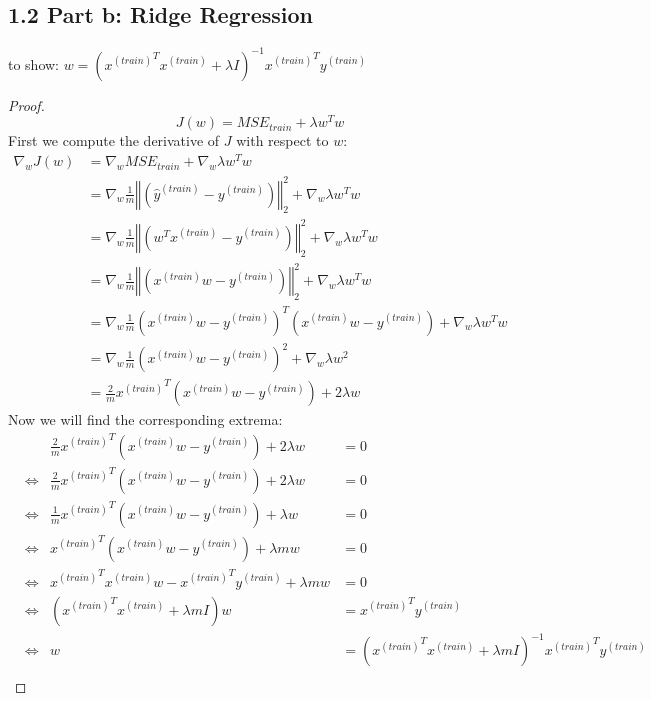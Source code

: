 \documentclass[a4paper]{article}
\begin{document}
    \subsection*{1.2 Part b: Ridge Regression}
        to show: $w = \left({x^{(train)}}^T x^{(train)} + \lambda I \right)^{-1} {x^{(train)}}^T y^{(train)}$
        \begin{proof}
            $$J(w) = MSE_{train} + \lambda w^T w$$
            First we compute the derivative of $J$ with respect to $w$:
            \begin{align*}
                \nabla_w J(w) &= \nabla_w MSE_{train} + \nabla_w \lambda w^T w\\
                &= \nabla_w  \frac{1}{m} {\left\Vert \left( \hat{y}^{(train)} - y^{(train)} \right) \right\Vert}^2_2 + \nabla_w \lambda w^T w\\
                &= \nabla_w \frac{1}{m} {\left\Vert \left( w^T x^{(train)} - y^{(train)} \right) \right\Vert}^2_2 + \nabla_w \lambda w^T w\\
                &= \nabla_w \frac{1}{m} {\left\Vert \left( x^{(train)} w - y^{(train)} \right) \right\Vert}^2_2 + \nabla_w \lambda w^T w\\
                &= \nabla_w \frac{1}{m} \left( x^{(train)} w - y^{(train)} \right)^T \left( x^{(train)} w - y^{(train)} \right) + \nabla_w \lambda w^T w\\
                &= \nabla_w \frac{1}{m} \left( x^{(train)} w - y^{(train)} \right)^2 + \nabla_w \lambda w^2\\
                &= \frac{2}{m} {x^{(train)}}^T \left( x^{(train)} w - y^{(train)} \right) + 2 \lambda w
            \end{align*}
            Now we will find the corresponding extrema:
            \begin{align*}
                & & \frac{2}{m} {x^{(train)}}^T \left( x^{(train)} w - y^{(train)} \right) + 2 \lambda w &= 0\\
                &\Leftrightarrow &  \frac{2}{m} {x^{(train)}}^T \left( x^{(train)} w - y^{(train)} \right) + 2 \lambda w &= 0\\
                &\Leftrightarrow &  \frac{1}{m} {x^{(train)}}^T \left( x^{(train)} w - y^{(train)} \right) + \lambda w &= 0\\
                &\Leftrightarrow &  {x^{(train)}}^T \left( x^{(train)} w - y^{(train)} \right) + \lambda m w &= 0\\
                &\Leftrightarrow &  {x^{(train)}}^T x^{(train)} w - {x^{(train)}}^T y^{(train)} + \lambda m w &= 0\\
                &\Leftrightarrow &  \left( {x^{(train)}}^T x^{(train)} + \lambda m I \right) w &= {x^{(train)}}^T y^{(train)}\\
                &\Leftrightarrow &  w &= {\left( {x^{(train)}}^T x^{(train)} + \lambda m I \right)}^{-1} {x^{(train)}}^T y^{(train)}\\
            \end{align*}
        \end{proof}
    
\end{document}
